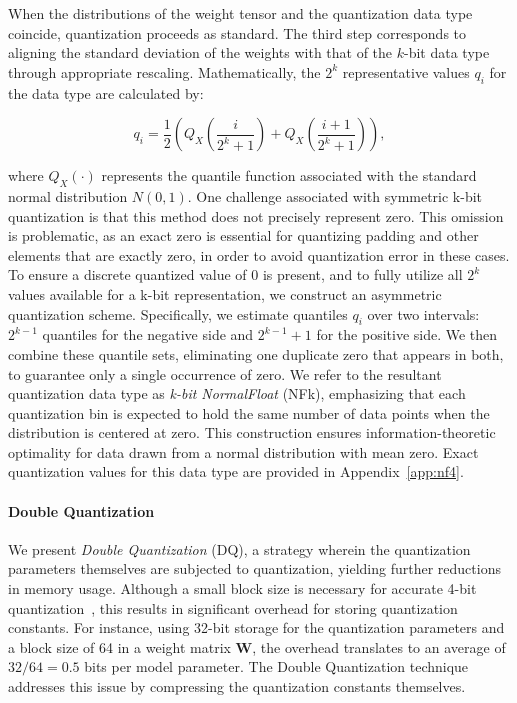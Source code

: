 When the distributions of the weight tensor and the quantization data type coincide, quantization proceeds as standard. The third step corresponds to aligning the standard deviation of the weights with that of the $k$-bit data type through appropriate rescaling. Mathematically, the $2^k$ representative values $q_i$ for the data type are calculated by:

\begin{equation}
q_i  = \frac{1}{2}\left( Q_X\left(\frac{i}{2^k+1}\right) + Q_X\left(\frac{i+1}{2^k+1}\right)\right),
\end{equation}

where $Q_X(\cdot)$ represents the quantile function associated with the standard normal distribution $N(0,1)$. One challenge associated with symmetric k-bit quantization is that this method does not precisely represent zero. This omission is problematic, as an exact zero is essential for quantizing padding and other elements that are exactly zero, in order to avoid quantization error in these cases. To ensure a discrete quantized value of $0$ is present, and to fully utilize all $2^k$ values available for a k-bit representation, we construct an asymmetric quantization scheme. Specifically, we estimate quantiles $q_i$ over two intervals: $2^{k-1}$ quantiles for the negative side and $2^{k-1}+1$ for the positive side. We then combine these quantile sets, eliminating one duplicate zero that appears in both, to guarantee only a single occurrence of zero. We refer to the resultant quantization data type as \emph{k-bit NormalFloat} (NFk), emphasizing that each quantization bin is expected to hold the same number of data points when the distribution is centered at zero. This construction ensures information-theoretic optimality for data drawn from a normal distribution with mean zero. Exact quantization values for this data type are provided in Appendix~\ref{app:nf4}.

\paragraph{Double Quantization{}}
We present \emph{Double Quantization} (DQ), a strategy wherein the quantization parameters themselves are subjected to quantization, yielding further reductions in memory usage. Although a small block size is necessary for accurate 4-bit quantization~\citep{dettmers2022case}, this results in significant overhead for storing quantization constants. For instance, using 32-bit storage for the quantization parameters and a block size of 64 in a weight matrix $\mathbf{W}$, the overhead translates to an average of $32/64 = 0.5$ bits per model parameter. The Double Quantization technique addresses this issue by compressing the quantization constants themselves.

